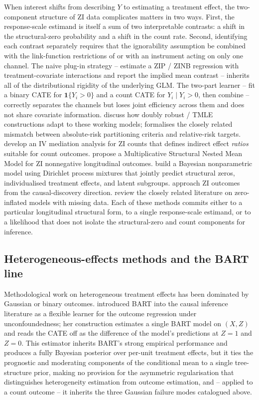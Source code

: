 \documentclass[11pt]{article}
\theoremstyle{plain}
\theoremstyle{definition}
\theoremstyle{remark}
\newcommand{\ind}{\mathbf{1}}
\begin{document}
When interest shifts from describing $Y$ to estimating a treatment
effect, the two-component structure of ZI data complicates matters in
two ways. First, the response-scale estimand is itself a sum of two
interpretable contrasts: a shift in the structural-zero probability
and a shift in the count rate. Second, identifying each contrast
separately requires that the ignorability assumption be combined with
the link-function restrictions of \citet{li2012zipidentifiability} or
with an instrument acting on only one channel. The naive plug-in
strategy -- estimate a ZIP / ZINB regression with treatment-covariate
interactions and report the implied mean contrast -- inherits all of
the distributional rigidity of the underlying GLM. The two-part
learner -- fit a binary CATE for $\ind\{Y_i > 0\}$ and a count CATE
for $Y_i \mid Y_i > 0$, then combine -- correctly separates the
channels but loses joint efficiency across them and does not share
covariate information. \citet{vanderlaan2011targeted} discuss how
doubly robust / TMLE constructions adapt to these working models;
\citet{kennedy2024relative} formalises the closely related mismatch
between absolute-risk partitioning criteria and relative-risk targets.
\citet{guo2016mediation} develop an IV mediation analysis for ZI
counts that defines indirect effect \emph{ratios} suitable for
count outcomes. \citet{yu2022msnmm} propose a Multiplicative
Structural Nested Mean Model for ZI nonnegative longitudinal
outcomes. \citet{oganisian2021bayesian} build a Bayesian nonparametric
model using Dirichlet process mixtures that jointly predict
structural zeros, individualised treatment effects, and latent
subgroups. \citet{choi2023zigdag} approach ZI outcomes from the
causal-discovery direction. \citet{lukusa2017review} review the
closely related literature on zero-inflated models with missing data.
Each of these methods commits either to a particular longitudinal
structural form, to a single response-scale estimand, or to a
likelihood that does not isolate the structural-zero and count
components for inference.

\subsection{Heterogeneous-effects methods and the BART
line}\label{sec:lit-hte-bart}

Methodological work on heterogeneous treatment effects has been
dominated by Gaussian or binary outcomes. \citet{hill2011bayesian}
introduced BART \citep{chipman2010bart, chipman1998bayesian} into the
causal inference literature as a flexible learner for the outcome
regression under unconfoundedness; her construction estimates a
single BART model on $(X, Z)$ and reads the CATE off as the difference
of the model's predictions at $Z = 1$ and $Z = 0$. This estimator
inherits BART's strong empirical performance and produces a fully
Bayesian posterior over per-unit treatment effects, but it ties the
prognostic and moderating components of the conditional mean to a
single tree-structure prior, making no provision for the asymmetric
regularisation that distinguishes heterogeneity estimation from
outcome estimation, and -- applied to a count outcome -- it inherits
the three Gaussian failure modes catalogued above.
\end{document}
